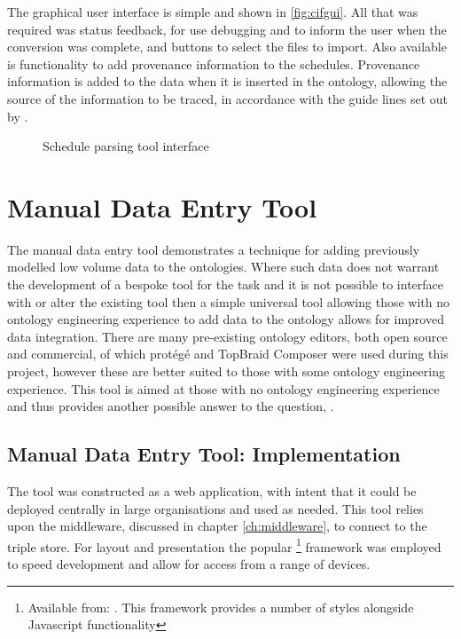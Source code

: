 The graphical user interface is simple and shown in \autoref{fig:cifgui}. All that was required was status feedback, for use debugging and to inform the user when the conversion was complete, and buttons to select the files to import. Also available is functionality to add provenance information to the schedules. Provenance information is added to the data when it is inserted in the ontology, allowing the source of the information to be traced, in accordance with the guide lines set out by \citet{Tutcher2015}.

\begin{figure}[H]
\myfloatalign
{}
\caption{Schedule parsing tool interface}
\label{fig:cifgui}
\end{figure}

\section{Manual Data Entry Tool}
\label{sec:manualtool}
The manual data entry tool demonstrates a technique for adding previously modelled low volume data to the ontologies. Where such data does not warrant the development of a bespoke tool for the task and it is not possible to interface with or alter the existing tool then a simple universal tool allowing those with no ontology engineering experience to add data to the ontology allows for improved data integration. There are many pre-existing ontology editors, both open source and commercial, of which protégé and TopBraid Composer were used during this project, however these are better suited to those with some ontology engineering experience. This tool is aimed at those with no ontology engineering experience and thus provides another possible answer to the question, \say{\QuestionOtherData}.

\subsection{Manual Data Entry Tool: Implementation}
The tool was constructed as a web application, with intent that it could be deployed centrally in large organisations and used as needed. This tool relies upon the middleware, discussed in chapter \ref{ch:middleware}, to connect to the triple store. For layout and presentation the popular \footnote{Available from: . This framework provides a number of styles alongside Javascript functionality} framework was employed to speed development and allow for access from a range of devices.

